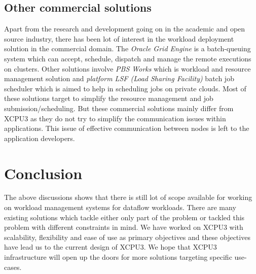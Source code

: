 \subsection{Other commercial solutions}
Apart from the research and development going on in the academic and open
source industry, there has been lot of interest in the workload deployment
solution in the commercial domain.  The \textit{Oracle Grid Engine}\cite{oge} is
a batch-queuing system which can accept, schedule, dispatch and manage the
remote executions on clusters.  Other solutions involve \textit{PBS
Works}\cite{pbsworks} which is workload and resource management solution and
\textit{platform LSF (Load Sharing Facility)}\cite{platformLSF} batch job
scheduler which is aimed to help in scheduling jobs on private clouds.  Most of
these solutions target to simplify the resource management and job
submission/scheduling.  But these commercial solutions mainly differ from XCPU3
as they do not try to simplify the communication issues within applications. 
This issue of effective communication between nodes is left to the application
developers.


\section{Conclusion}
The above discussions shows that there is still lot of scope available for
working on workload management systems for dataflow workloads.  There are many
existing solutions which tackle either only part of the problem or tackled this
problem with different constraints in mind.  We have worked on XCPU3 with
scalability, flexibility and ease of use as primary objectives and these
objectives have lead us to the current design of XCPU3.  We hope that XCPU3
infrastructure will open up the doors for more solutions targeting specific
use-cases.


